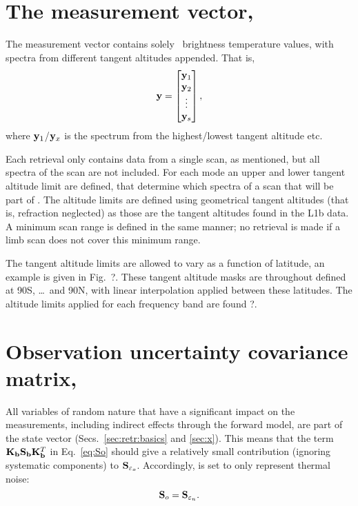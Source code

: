 \section{The measurement vector, \MsrVct}
\label{sec:y}
%
The measurement vector contains solely \smr\ brightness temperature values,
with spectra from different tangent altitudes appended. That is,
\begin{equation}
  \label{eq:y}
  \mathbf{y} =
  \begin{bmatrix}
    \mathbf{y}_1\\ 
    \mathbf{y}_2\\ 
    \vdots\\ 
    \mathbf{y}_s
  \end{bmatrix},
\end{equation}
where $\mathbf{y}_1$/$\mathbf{y}_x$ is the spectrum from the highest/lowest tangent
altitude etc. 

Each retrieval only contains data from a single scan, as mentioned, but all
spectra of the scan are not included. For each mode an upper and lower tangent
altitude limit are defined, that determine which spectra of a scan that will be
part of \MsrVct. The altitude limits are defined using geometrical tangent
altitudes (that is, refraction neglected) as those are the tangent altitudes
found in the L1b data. A minimum scan range is defined in the same manner; no
retrieval is made if a limb scan does not cover this minimum range.

The tangent altitude limits are allowed to vary as a function of latitude, an
example is given in Fig.~?. These tangent altitude masks are
throughout defined at 90\degree S, \dots{}\ and 90\degree N,
with linear interpolation applied between these latitudes. The altitude limits
applied for each frequency band are found ?.



\section{Observation uncertainty covariance matrix, }
\label{sec:So}
%
All variables of random nature that have a significant impact on the
measurements, including indirect effects through the forward model, are part of
the state vector (Secs.~\ref{sec:retr:basics} and \ref{sec:x}). This means that
the term $\mathbf{K}_{\mathbf{b}}\mathbf{S}_{\mathbf{b}} \mathbf{K}_{\mathbf{b}}^T$ in
Eq.~\ref{eq:So} should give a relatively small contribution (ignoring
systematic components) to $\mathbf{S}_{\varepsilon_o}$. Accordingly,  is
set to only represent thermal noise:
\begin{equation}
  \mathbf{S}_{o} = \mathbf{S}_{\varepsilon_n}.
\end{equation}
\\


